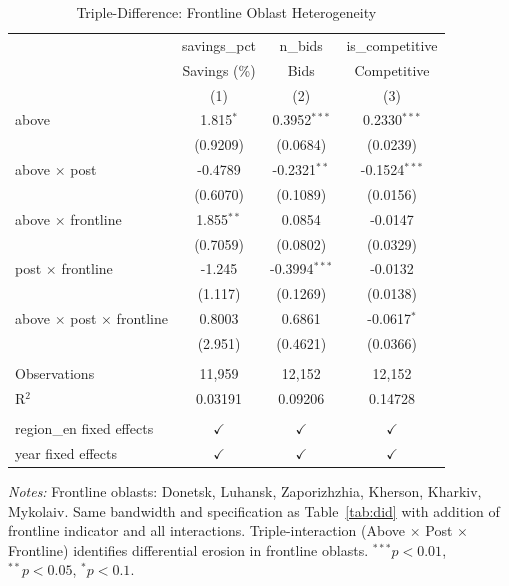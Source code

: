 
\begin{table}[htbp]
   \caption{\label{tab:ddd} Triple-Difference: Frontline Oblast Heterogeneity}
   \bigskip
   \centering
   \begin{tabular}{lccc}
      \toprule
                                               & savings\_pct  & n\_bids         & is\_competitive\\   
                                               & Savings (\%)  & Bids            & Competitive \\   
                                               & (1)           & (2)             & (3)\\  
      \midrule 
      above                                    & 1.815$^{*}$   & 0.3952$^{***}$  & 0.2330$^{***}$\\   
                                               & (0.9209)      & (0.0684)        & (0.0239)\\   
      above $\times$ post                      & -0.4789       & -0.2321$^{**}$  & -0.1524$^{***}$\\   
                                               & (0.6070)      & (0.1089)        & (0.0156)\\   
      above $\times$ frontline                 & 1.855$^{**}$  & 0.0854          & -0.0147\\   
                                               & (0.7059)      & (0.0802)        & (0.0329)\\   
      post $\times$ frontline                  & -1.245        & -0.3994$^{***}$ & -0.0132\\   
                                               & (1.117)       & (0.1269)        & (0.0138)\\   
      above $\times$ post $\times$ frontline   & 0.8003        & 0.6861          & -0.0617$^{*}$\\   
                                               & (2.951)       & (0.4621)        & (0.0366)\\   
       \\
      Observations                             & 11,959        & 12,152          & 12,152\\  
      R$^2$                                    & 0.03191       & 0.09206         & 0.14728\\  
       \\
      region\_en fixed effects                 & $\checkmark$  & $\checkmark$    & $\checkmark$\\   
      year fixed effects                       & $\checkmark$  & $\checkmark$    & $\checkmark$\\   
      \bottomrule
   \end{tabular}
   
   \par \raggedright \footnotesize
   \textit{Notes:} Frontline oblasts: Donetsk, Luhansk, Zaporizhzhia, Kherson, Kharkiv, Mykolaiv. Same bandwidth and specification as Table~\ref{tab:did} with addition of frontline indicator and all interactions. Triple-interaction (Above $\times$ Post $\times$ Frontline) identifies differential erosion in frontline oblasts. $^{***}p<0.01$, $^{**}p<0.05$, $^{*}p<0.1$.
\end{table}


